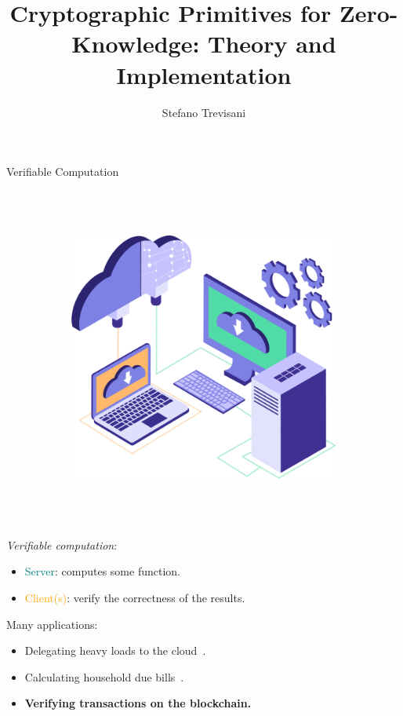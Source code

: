 \documentclass[beamer={10pt,xcolor=dvipsnames},target=mst]{thud}
\title{Cryptographic Primitives for Zero-Knowledge: Theory and Implementation}
\author{Stefano Trevisani}
\begin{document}
\maketitle

\begin{frame}{Verifiable Computation}
  \begin{figure}
    \centering
    \href{https://www.template.net/editable/illustrations}{
      \includegraphics[scale=0.0625]{res/cloud_computing.pdf}}
  \end{figure}

  \emph{Verifiable computation}:
  \begin{itemize}
    \item \textcolor{teal}{Server}: computes some function.
    \item \textcolor{orange}{Client(s)}: verify the correctness of the results.
  \end{itemize}
  \vspace*{16pt}
  Many applications:
  \begin{itemize}
    \item Delegating heavy loads to the cloud~\cite{AndersonCKLW2002}.
    \item Calculating household due bills~\cite{ParnoGHR2013}.
    \item \textbf{Verifying transactions on the blockchain.}~\cite{SassonCGGMTV2014}
  \end{itemize}
\end{frame}
\end{document}
